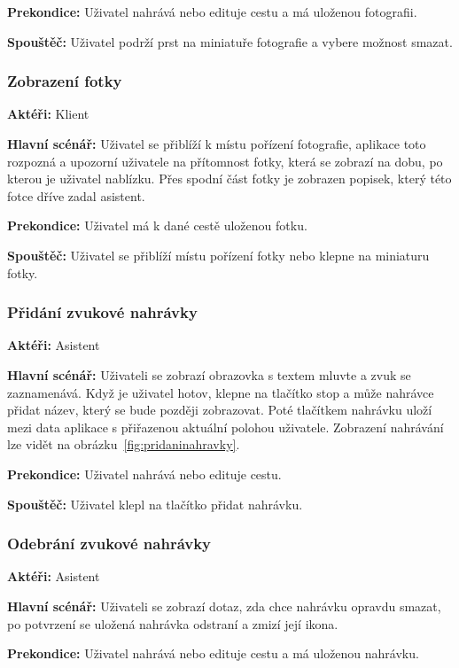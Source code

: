\documentclass[czech,master,public,dept460,male,java,cpdeclaration]{diploma}
\newcommand{\usecase}[2]{\subsubsection{#1}\label{#2}}
\begin{document}
\vspace{0.1cm}
\noindent
\textbf{Prekondice:} Uživatel nahrává nebo edituje cestu a má uloženou fotografii.

\vspace{0.1cm}
\noindent
\textbf{Spouštěč:} Uživatel podrží prst na miniatuře fotografie a vybere možnost smazat.

\usecase{Zobrazení fotky}{zobrazenifotky}
\textbf{Aktéři:} Klient

\vspace{0.1cm}
\noindent
\textbf{Hlavní scénář:} Uživatel se přiblíží k místu pořízení fotografie, aplikace toto rozpozná
a upozorní uživatele na přítomnost fotky, která se zobrazí na dobu, po kterou je uživatel nablízku.
Přes spodní část fotky je zobrazen popisek, který této fotce dříve zadal asistent.

\vspace{0.1cm}
\noindent
\textbf{Prekondice:} Uživatel má k dané cestě uloženou fotku.

\vspace{0.1cm}
\noindent
\textbf{Spouštěč:} Uživatel se přiblíží místu pořízení fotky nebo klepne na miniaturu fotky.


\usecase{Přidání zvukové nahrávky}{pridaninahravky}
\textbf{Aktéři:} Asistent

\vspace{0.1cm}
\noindent
\textbf{Hlavní scénář:} Uživateli se zobrazí obrazovka s textem mluvte a zvuk se zaznamenává.
Když je uživatel hotov, klepne na tlačítko stop a může nahrávce přidat název, který se bude později zobrazovat.
Poté tlačítkem nahrávku uloží mezi data aplikace s přiřazenou aktuální polohou uživatele.
Zobrazení nahrávání lze vidět na obrázku~\ref{fig:pridaninahravky}.

\vspace{0.1cm}
\noindent
\textbf{Prekondice:} Uživatel nahrává nebo edituje cestu.

\vspace{0.1cm}
\noindent
\textbf{Spouštěč:} Uživatel klepl na tlačítko přidat nahrávku.


\usecase{Odebrání zvukové nahrávky}{odebraninahravky}
\textbf{Aktéři:} Asistent

\vspace{0.1cm}
\noindent
\textbf{Hlavní scénář:} Uživateli se zobrazí dotaz, zda chce nahrávku opravdu smazat, po potvrzení
se uložená nahrávka odstraní a zmizí její ikona.

\vspace{0.1cm}
\noindent
\textbf{Prekondice:} Uživatel nahrává nebo edituje cestu a má uloženou nahrávku.
\end{document}

